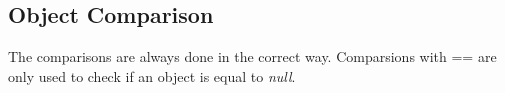 \subsection{Object Comparison}

The comparisons are always done in the correct way. Comparsions with == are only used to check if an object is equal to \textit{null}.